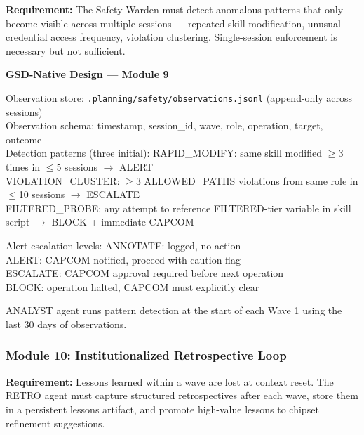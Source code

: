 \documentclass[11pt,letterpaper]{article}
\begin{document}
\textbf{Requirement:} The Safety Warden must detect anomalous patterns that only become visible across multiple sessions --- repeated skill modification, unusual credential access frequency, violation clustering. Single-session enforcement is necessary but not sufficient.

\begin{implbox}
\textbf{GSD-Native Design --- Module 9}

Observation store: \texttt{.planning/safety/observations.jsonl} (append-only across sessions)\\
Observation schema: timestamp, session\_id, wave, role, operation, target, outcome\\
Detection patterns (three initial):
  RAPID\_MODIFY: same skill modified $\geq$3 times in $\leq$5 sessions $\rightarrow$ ALERT\\
  VIOLATION\_CLUSTER: $\geq$3 ALLOWED\_PATHS violations from same role in $\leq$10 sessions $\rightarrow$ ESCALATE\\
  FILTERED\_PROBE: any attempt to reference FILTERED-tier variable in skill script $\rightarrow$ BLOCK + immediate CAPCOM

Alert escalation levels:
  ANNOTATE: logged, no action\\
  ALERT: CAPCOM notified, proceed with caution flag\\
  ESCALATE: CAPCOM approval required before next operation\\
  BLOCK: operation halted, CAPCOM must explicitly clear

ANALYST agent runs pattern detection at the start of each Wave 1 using the last 30 days of observations.
\end{implbox}

\subsubsection{Module 10: Institutionalized Retrospective Loop}

\textbf{Requirement:} Lessons learned within a wave are lost at context reset. The RETRO agent must capture structured retrospectives after each wave, store them in a persistent lessons artifact, and promote high-value lessons to chipset refinement suggestions.
\end{document}
